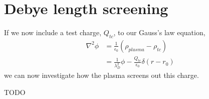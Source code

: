 \documentclass{article}
\begin{document}
\section{Debye length screening}

If we now include a test charge, $Q_{tc}$, to our Gauss's law equation,
\begin{equation}
\begin{split}
\nabla^2 \phi &= \frac{1}{\epsilon_0}\left( \rho_{plasma} - \rho_{tc}\right) \\
&= \frac{1}{\lambda_D^2}\phi - \frac{Q_{tc}}{\epsilon_0}\delta (r-r_0)
\end{split}
\end{equation}
we can now investigate how the plasma screens out this charge.

TODO
\end{document}
